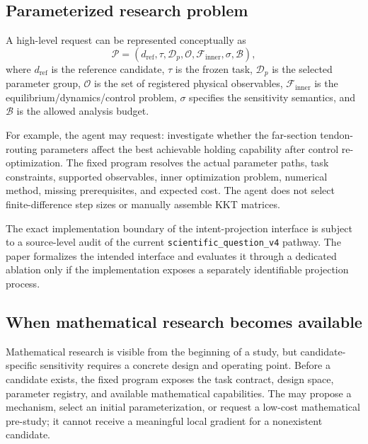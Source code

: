 \subsection{Parameterized research problem}

A high-level request can be represented conceptually as
\begin{equation}
\mathcal P=
(d_{\mathrm{ref}},\tau,\mathcal D_p,\mathcal O,
\mathcal F_{\mathrm{inner}},\sigma,\mathcal B),
\label{eq:parameterizedproblem}
\end{equation}
where $d_{\mathrm{ref}}$ is the reference candidate, $\tau$ is the frozen task, $\mathcal D_p$ is the selected parameter group, $\mathcal O$ is the set of registered physical observables, $\mathcal F_{\mathrm{inner}}$ is the equilibrium/dynamics/control problem, $\sigma$ specifies the sensitivity semantics, and $\mathcal B$ is the allowed analysis budget.

For example, the agent may request: investigate whether the far-section tendon-routing parameters affect the best achievable holding capability after control re-optimization. The fixed program resolves the actual parameter paths, task constraints, supported observables, inner optimization problem, numerical method, missing prerequisites, and expected cost. The agent does not select finite-difference step sizes or manually assemble KKT matrices.

The exact implementation boundary of the intent-projection interface is subject to a source-level audit of the current \texttt{scientific\_question\_v4} pathway. The paper formalizes the intended interface and evaluates it through a dedicated ablation only if the implementation exposes a separately identifiable projection process.


\subsection{When mathematical research becomes available}

Mathematical research is visible from the beginning of a study, but candidate-specific sensitivity requires a concrete design and operating point. Before a candidate exists, the fixed program exposes the task contract, design space, parameter registry, and available mathematical capabilities. The \MainAgent{} may propose a mechanism, select an initial parameterization, or request a low-cost mathematical pre-study; it cannot receive a meaningful local gradient for a nonexistent candidate.

